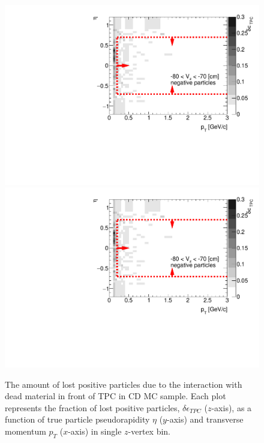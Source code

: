 \begin{figure}[H]
	\caption[The amount of lost positive particles due to the interaction with dead material in front of TPC as a function of $p_T$, $\eta$ and $z$-vertex in CD]{The amount of lost positive particles due to the interaction with dead material in front of TPC in CD MC sample. Each plot represents the fraction of lost positive particles, $\delta\epsilon_{ TPC}$ ($z$-axis), as a function of true particle pseudorapidity $\eta$ ($y$-axis) and transverse momentum $p_{T}$ ($x$-axis) in single $z$-vertex bin.}\label{fig:dead_materialCD3Dpositive}
	\parbox{0.325\textwidth}{
		\includegraphics[width=\linewidth,page=17]{graphics/systematicsEfficiency/deadMaterial/secondaries_Unbinned_Charged_CD.pdf}\\
		\includegraphics[width=\linewidth,page=20]{graphics/systematicsEfficiency/deadMaterial/secondaries_Unbinned_Charged_CD.pdf}\\
}
\end{figure}
